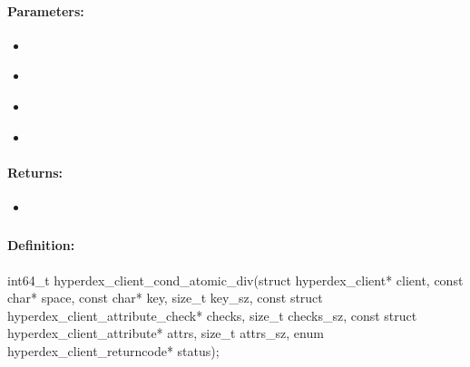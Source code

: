 \paragraph{Parameters:}
\begin{itemize}[noitemsep]
\item {}\\

\item {}\\

\item {}\\

\item {}\\

\end{itemize}

\paragraph{Returns:}
\begin{itemize}[noitemsep]
\item {}\\

\end{itemize}

\pagebreak
\subsubsection{}
\label{api:c:cond_atomic_div}


\paragraph{Definition:}
\begin{ccode}
int64_t hyperdex_client_cond_atomic_div(struct hyperdex_client* client,
        const char* space,
        const char* key, size_t key_sz,
        const struct hyperdex_client_attribute_check* checks, size_t checks_sz,
        const struct hyperdex_client_attribute* attrs, size_t attrs_sz,
        enum hyperdex_client_returncode* status);
\end{ccode}

